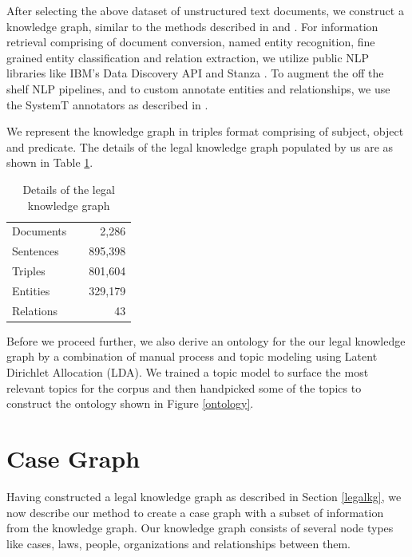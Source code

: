 \documentclass[12pt]{ceurart}
\begin{document}
After selecting the above dataset of unstructured text documents, we construct a knowledge graph, similar to the methods described in \cite{agarwal2017cognitive} and \cite{vannur2021data}. For information retrieval comprising of document conversion, named entity recognition, fine grained entity classification and relation extraction, we utilize public NLP libraries like IBM's Data Discovery API \cite{shanmukha2019ddapi} and Stanza \cite{stanza}. To augment the off the shelf NLP pipelines, and to custom annotate entities and relationships, we use the SystemT annotators as described in \cite{chiticariu2010systemt}.

We represent the knowledge graph in triples format comprising of subject, object and predicate. The details of the legal knowledge graph populated by us are as shown in Table \ref{tab:akbc}.


\begin{table}[!htb]
\caption{Details of the legal knowledge graph}
\label{tab:akbc}
\centering
\begin{tabular}{lcr}
\hline
Documents     &{     } & 2,286   \\
Sentences    &{     } & 895,398 \\
Triples &{     } & 801,604 \\
Entities &{    } & 329,179 \\
Relations &{   } & 43 \\
\hline
\end{tabular}
\end{table}

Before we proceed further, we also derive an ontology for the our legal knowledge graph by a combination of manual process and topic modeling using Latent Dirichlet Allocation (LDA). We trained a topic model to surface the most relevant topics for the corpus and then handpicked some of the topics to construct the ontology shown in Figure \ref{ontology}.

\section{Case Graph}
\label{sec:case_graph}

Having constructed a legal knowledge graph as described in Section \ref{legalkg}, we now describe our method to create a case graph with a subset of information from the knowledge graph. Our knowledge graph consists of several node types like cases, laws, people, organizations and relationships between them.
\end{document}
